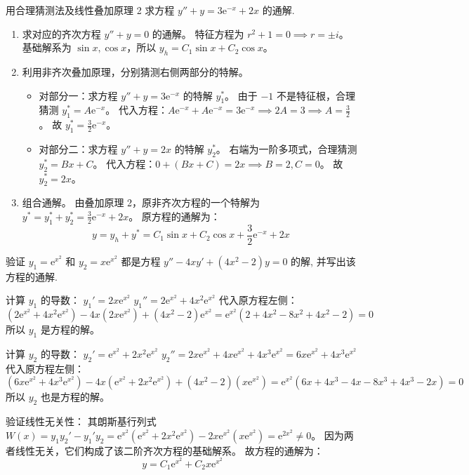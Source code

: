 \documentclass[lang=cn,11pt]{elegantbook}
\begin{document}
\begin{exercise}[非齐次叠加原理与猜测法]
用合理猜测法及线性叠加原理 2 求方程 $y''+y=3\mathrm{e}^{-x}+2x$ 的通解.
\end{exercise}
\begin{solution}
\begin{enumerate}
    \item 求对应的齐次方程 $y''+y=0$ 的通解。
特征方程为 $r^2+1=0 \implies r=\pm i$。
基础解系为 $\sin x, \cos x$，所以 $y_h = C_1\sin x + C_2\cos x$。
\item 利用非齐次叠加原理，分别猜测右侧两部分的特解。
\begin{itemize}
\item 对部分一：求方程 $y''+y = 3\mathrm{e}^{-x}$ 的特解 $y_1^*$。
由于 $-1$ 不是特征根，合理猜测 $y_1^* = A\mathrm{e}^{-x}$。
代入方程：$A\mathrm{e}^{-x} + A\mathrm{e}^{-x} = 3\mathrm{e}^{-x} \implies 2A = 3 \implies A = \frac{3}{2}$。
故 $y_1^* = \frac{3}{2}\mathrm{e}^{-x}$。
\item 对部分二：求方程 $y''+y = 2x$ 的特解 $y_2^*$。
右端为一阶多项式，合理猜测 $y_2^* = Bx + C$。
代入方程：$0 + (Bx + C) = 2x \implies B=2, C=0$。
故 $y_2^* = 2x$。
\end{itemize}
\item 组合通解。
由叠加原理 2，原非齐次方程的一个特解为 $y^* = y_1^* + y_2^* = \frac{3}{2}\mathrm{e}^{-x} + 2x$。
原方程的通解为：
\[
\boxed{y = y_h + y^* = C_1\sin x + C_2\cos x + \frac{3}{2}\mathrm{e}^{-x} + 2x}
\]
\end{enumerate}
\end{solution}

\begin{exercise}[解的验证与通解构造]
验证 $y_1=\mathrm{e}^{x^2}$ 和 $y_2=x\mathrm{e}^{x^2}$ 都是方程 $y''-4xy'+(4x^2-2)y=0$ 的解, 并写出该方程的通解.
\end{exercise}
\begin{solution}
计算 $y_1$ 的导数：
$y_1' = 2x\mathrm{e}^{x^2}$
$y_1'' = 2\mathrm{e}^{x^2} + 4x^2\mathrm{e}^{x^2}$
代入原方程左侧：
\[
(2\mathrm{e}^{x^2} + 4x^2\mathrm{e}^{x^2}) - 4x(2x\mathrm{e}^{x^2}) + (4x^2-2)\mathrm{e}^{x^2} = \mathrm{e}^{x^2}(2 + 4x^2 - 8x^2 + 4x^2 - 2) = 0
\]
所以 $y_1$ 是方程的解。

计算 $y_2$ 的导数：
$y_2' = \mathrm{e}^{x^2} + 2x^2\mathrm{e}^{x^2}$
$y_2'' = 2x\mathrm{e}^{x^2} + 4x\mathrm{e}^{x^2} + 4x^3\mathrm{e}^{x^2} = 6x\mathrm{e}^{x^2} + 4x^3\mathrm{e}^{x^2}$
代入原方程左侧：
\[
(6x\mathrm{e}^{x^2} + 4x^3\mathrm{e}^{x^2}) - 4x(\mathrm{e}^{x^2} + 2x^2\mathrm{e}^{x^2}) + (4x^2-2)(x\mathrm{e}^{x^2}) 
= \mathrm{e}^{x^2}(6x + 4x^3 - 4x - 8x^3 + 4x^3 - 2x) = 0
\]
所以 $y_2$ 也是方程的解。

验证线性无关性：
其朗斯基行列式 $W(x) = y_1 y_2' - y_1' y_2 = \mathrm{e}^{x^2}(\mathrm{e}^{x^2}+2x^2\mathrm{e}^{x^2}) - 2x\mathrm{e}^{x^2}(x\mathrm{e}^{x^2}) = \mathrm{e}^{2x^2} \neq 0$。
因为两者线性无关，它们构成了该二阶齐次方程的基础解系。
故方程的通解为：
\[
\boxed{y = C_1\mathrm{e}^{x^2} + C_2 x\mathrm{e}^{x^2}}
\]
\end{solution}
\end{document}
